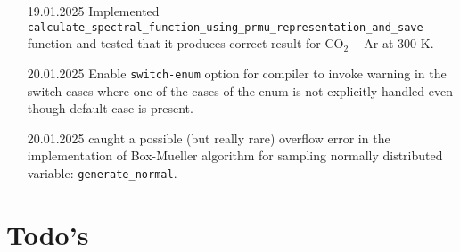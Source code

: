 \documentclass{article}
\begin{document}
\begin{enumerate}
    \item [19.01.2025] Implemented \texttt{calculate\_spectral\_function\_using\_prmu\_representation\_and\_save} function and tested that it produces correct result for CO$_2-$Ar at 300 K.
    \item [20.01.2025] Enable \texttt{switch-enum} option for compiler to invoke warning in the switch-cases where one of the cases of the enum is not explicitly handled even though default case is present. 
    \item [20.01.2025] caught a possible (but really rare) overflow error in the implementation of Box-Mueller algorithm for sampling normally distributed variable: \texttt{generate\_normal}. 
\end{enumerate}

\section{Todo's}
\end{document}
